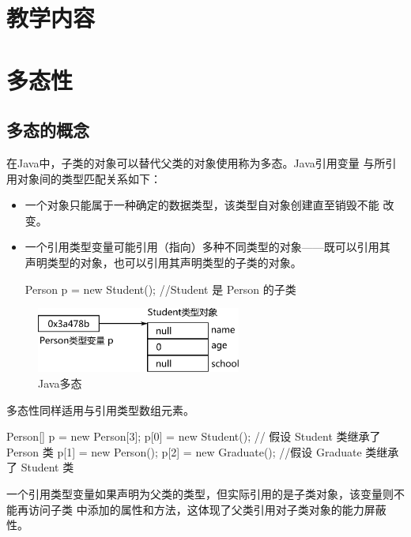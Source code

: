 \section*{教学内容}
\sline

\section{多态性}

\subsection{多态的概念}

在Java中，子类的对象可以替代父类的对象使用称为{\hei 多态}。Java引用变量
与所引用对象间的类型匹配关系如下：

\begin{itemize}
\item 一个对象只能属于一种确定的数据类型，该类型自对象创建直至销毁不能
  改变。
\item 一个引用类型变量可能引用（指向）多种不同类型的对象——既可以引用其
  声明类型的对象，也可以引用其声明类型的子类的对象。
  \begin{javaCode}
    Person p = new Student(); //Student 是 Person 的子类  
  \end{javaCode}
\end{itemize}

\begin{figure}[htb]
  \centering
  \includegraphics[width=0.6\textwidth]{images/Advanced-object-oriented-programming-2/fig-poly.pdf}
  \caption{Java多态}
  \label{fig:poly}
\end{figure}

多态性同样适用与引用类型数组元素。

\begin{javaCode}
  Person[] p = new Person[3]; 
  p[0] = new Student(); // 假设 Student 类继承了 Person 类
  p[1] = new Person();
  p[2] = new Graduate(); //假设 Graduate 类继承了 Student 类
\end{javaCode}

一个引用类型变量如果声明为父类的类型，但实际引用的是子类对象，该变量则不能再访问子类
中添加的属性和方法，这体现了父类引用对子类对象的能力屏蔽性。

